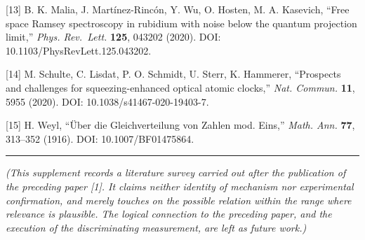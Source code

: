 \documentclass[
]{ltjsarticle}
\begin{document}
{[}13{]} B. K. Malia, J. Martínez-Rincón, Y. Wu, O. Hosten, M. A.
Kasevich, ``Free space Ramsey spectroscopy in rubidium with noise below
the quantum projection limit,'' \emph{Phys. Rev.~Lett.} \textbf{125},
043202 (2020). DOI: 10.1103/PhysRevLett.125.043202.

{[}14{]} M. Schulte, C. Lisdat, P. O. Schmidt, U. Sterr, K. Hammerer,
``Prospects and challenges for squeezing-enhanced optical atomic
clocks,'' \emph{Nat. Commun.} \textbf{11}, 5955 (2020). DOI:
10.1038/s41467-020-19403-7.

{[}15{]} H. Weyl, ``Über die Gleichverteilung von Zahlen mod. Eins,''
\emph{Math. Ann.} \textbf{77}, 313--352 (1916). DOI: 10.1007/BF01475864.

\begin{center}\rule{0.5\linewidth}{0.5pt}\end{center}

\emph{(This supplement records a literature survey carried out after the
publication of the preceding paper {[}1{]}. It claims neither identity
of mechanism nor experimental confirmation, and merely touches on the
possible relation within the range where relevance is plausible. The
logical connection to the preceding paper, and the execution of the
discriminating measurement, are left as future work.)}
\end{document}
